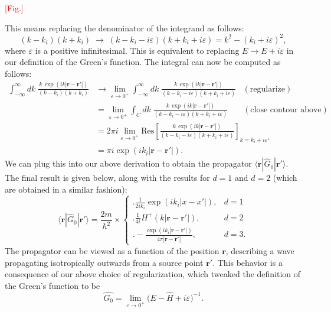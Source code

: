 \documentclass[pra,11pt]{revtex4}
\begin{document}
\textcolor{red}{[Fig.]}

This means replacing the denominator of the integrand as
follows:
$$(k - k_i)(k+k_i) \;\rightarrow\; (k - k_i - i\varepsilon)(k+k_i+i\varepsilon) = k^2 - (k_i+i\varepsilon)^2,$$
where $\varepsilon$ is a positive infinitesimal.  This is equivalent
to replacing $E \rightarrow E + i\varepsilon$ in our definition of the
Green's function.  The integral can now be computed as
follows:
$$\begin{aligned}\int_{-\infty}^\infty dk \; \frac{\displaystyle k\, \exp\left(ik|\mathbf{r}-\mathbf{r}'|\right)}{(k - k_i)(k+k_i)} &\rightarrow \lim_{\varepsilon \rightarrow 0^+} \int_{-\infty}^\infty dk \; \frac{\displaystyle k\, \exp\left(ik|\mathbf{r}-\mathbf{r}'|\right)}{(k - k_i - i\varepsilon)(k+k_i+i\varepsilon)}\;\;\; (\text{regularize}) \\ &= \lim_{\varepsilon \rightarrow 0^+} \int_C dk \; \frac{\displaystyle k\, \exp\left(ik|\mathbf{r}-\mathbf{r}'|\right)}{(k - k_i - i\varepsilon)(k+k_i+i\varepsilon)} \quad\;\;\; (\text{close contour above}) \\ &= 2\pi i \lim_{\varepsilon \rightarrow 0^+} \mathrm{Res}\left[\frac{\displaystyle k\, \exp\left(ik|\mathbf{r}-\mathbf{r}'|\right)}{(k - k_i - i\varepsilon)(k+k_i+i\varepsilon)}\right]_{k=k_i+i\varepsilon^+} \\ &= \pi i \exp\left(ik_i|\mathbf{r}-\mathbf{r}'|\right).\end{aligned}$$
We can plug this into our above derivation to obtain the propagator
$\langle\mathbf{r}|\hat{G}_0|\mathbf{r}'\rangle$.  The final result is
given below, along with the results for $d=1$ and $d=2$ (which are
obtained in a similar fashion):
$$\boxed{\;\;\;\langle\mathbf{r}|\hat{G}_0|\mathbf{r}'\rangle = \frac{2m}{\hbar^2} \times \begin{cases} \Bigg.\displaystyle\frac{1}{2ik_i} \exp\left(ik_i|x-x'|\right),& d=1\\ \Bigg. \displaystyle\frac{1}{4i} H^+(k|\mathbf{r}-\mathbf{r'}|), & d=2 \\ \displaystyle \Bigg. - \frac{\exp\left(ik_i|\mathbf{r}-\mathbf{r}'|\right)}{4\pi|\mathbf{r}-\mathbf{r}'|}, & d = 3.  \end{cases}\;\;\;}$$
The propagator can be viewed as a function of the position
$\mathbf{r}$, describing a wave propagating isotropically outwards
from a source point $\mathbf{r}'$.  This behavior is a consequence of
our above choice of regularization, which tweaked the definition of
the Green's function to be
$$\boxed{\quad\hat{G_0} = \lim_{\varepsilon\rightarrow 0^+} \big(E - \hat{H} + i \varepsilon\big)^{-1}.\quad}$$
\end{document}
